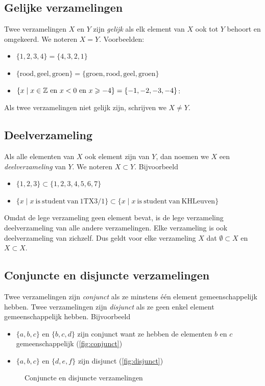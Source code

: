 \subsection{Gelijke verzamelingen}
Twee verzamelingen $X$ en $Y$ zijn \emph{gelijk} als elk element van $X$ ook tot $Y$ behoort en omgekeerd. We noteren $X=Y$. Voorbeelden:
\begin{itemize}
\item $\{1,2,3,4 \}=\{4,3,2,1 \}$
\item $\{\mathrm{rood, geel, groen} \}=\{\mathrm{groen, rood, geel, groen} \}$
\item $\{x\mid x \in \mathbb{Z} ~\mathrm{ en }~ x<0 ~\mathrm{ en }~ x\geqslant -4\}=\{-1,-2,-3,-4 \}$:
\end{itemize}
Als twee verzamelingen niet gelijk zijn, schrijven we $X \not = Y$.

\subsection{Deelverzameling}
Als alle elementen van $X$ ook element zijn van $Y$, dan noemen we $X$ een \emph{deelverzameling} van $Y$. We noteren $X\subset Y$. Bijvoorbeeld
\begin{itemize}
\item $\{1,2,3 \}\subset \{ 1,2,3,4,5,6,7 \}$
\item $\{x \mid x ~\mathrm{is~student~van~1TX3/1} \} \subset \{x \mid x ~\mathrm{is~student~van~KHLeuven} \}$
\end{itemize}

Omdat de lege verzameling geen element bevat, is de lege verzameling  deelverzameling van alle andere verzamelingen. Elke verzameling is ook deelverzameling van zichzelf. Dus geldt voor elke verzameling $X$ dat $\emptyset \subset X$ en $X \subset X$.

\subsection{Conjuncte en disjuncte verzamelingen}
Twee verzamelingen zijn \emph{conjunct} als ze minstens \'e\'en element gemeenschappelijk hebben.
Twee verzamelingen zijn \emph{disjunct} als ze geen enkel element gemeenschappelijk hebben. Bijvoorbeeld
\begin{itemize}
  \item $\{ a, b, c \}$ en $\{ b, c, d \}$ zijn conjunct want ze hebben de elementen $b$ en $c$ gemeenschappelijk (\cref{fig:conjunct}) 
  \item  $\{ a, b, c \}$ en $\{ d, e, f \}$ zijn disjunct (\cref{fig:disjunct})
\end{itemize}
\begin{figure}
  \centering
  \qquad
  \caption{Conjuncte en disjuncte verzamelingen}
  \label{fig:conjunct-disjunct}
\end{figure}

